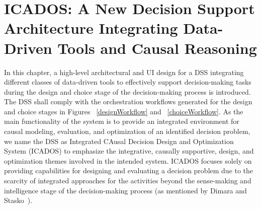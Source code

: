 \documentclass{sfuthesis}
\begin{document}
\chapter{ICADOS: A New Decision Support Architecture Integrating Data-Driven Tools and Causal Reasoning}
In this chapter, a high-level architectural and UI design for a DSS integrating different classes of data-driven tools to effectively support decision-making tasks during the design and choice stage of the decision-making process is introduced. The DSS shall comply with the orchestration workflows generated for the design and choice stages in Figures ~\ref{designWorkflow} and ~\ref{choiceWorkflow}. As the main functionality of the system is to provide an integrated environment for causal modeling, evaluation, and optimization of an identified decision problem, we name the DSS as Integrated CAusal Decision Design and Optimization System (ICADOS) to emphasize the integrative, causally supportive, design, and optimization themes involved in the intended system. ICADOS focuses solely on providing capabilities for designing and evaluating a decision problem due to the scarcity of integrated approaches for the activities beyond the sense-making and intelligence stage of the decision-making process (as mentioned by Dimara and Stasko~\cite{dimara_critical_2022}).  
\end{document}
